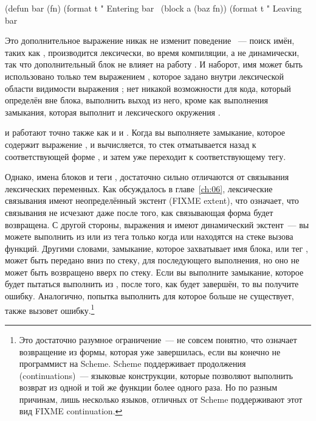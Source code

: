 \begin{myverb}
(defun bar (fn)
  (format t "  Entering bar~%
  (block a (baz fn))
  (format t "  Leaving bar~%
\end{myverb}

Это дополнительное выражение  никак не изменит поведение ~--- поиск
имён, таких как , производится лексически, во время компиляции, а не динамически,
так что дополнительный блок не влияет на работу . И наборот, имя
 может быть использовано только тем выражением , которое
задано внутри лексической области видимости выражения ; нет никакой
возможности для кода, который определён вне блока, выполнить выход из него, кроме как
выполнения замыкания, которая выполнит  и лексического окружения
.

 и  работают точно также как и  и .
Когда вы выполняете замыкание, которое содержит выражение , и 
вычисляется, то стек отматывается назад к соответствующей форме , и затем
уже переходит к соответствующему тегу.

Однако, имена блоков  и теги , достаточно сильно отличаются от
связывания лексических переменных. Как обсуждалось в главе~\ref{ch:06}, лексические
связывания имеют неопределённый экстент (FIXME extent), что означает, что связывания не
исчезают даже после того, как связывающая форма будет возвращена. С другой стороны,
выражения  и  имеют динамический экстент~--- вы можете выполнить
 из  или  из тега  только когда
 или  находятся на стеке вызова функций. Другими словами,
замыкание, которое захватывает имя блока, или тег , может быть передано вниз
по стеку, для последующего выполнения, но оно не может быть возвращено вверх по
стеку. Если вы выполните замыкание, которое будет пытаться выполнить  из
, после того, как  будет завершён, то вы получите
ошибку. Аналогично, попытка выполнить  для  которое больше не
существует, также вызовет ошибку.\footnote{Это достаточно разумное ограничение~--- не
  совсем понятно, что означает возвращение из формы, которая уже завершилась, если вы
  конечно не программист на Scheme. Scheme поддерживает продолжения (continuations)~---
  языковые конструкции, которые позволяют выполнить возврат из одной и той же функции
  более одного раза. Но по разным причинам, лишь несколько языков, отличных от Scheme
  поддерживают этот вид FIXME continuation.}

